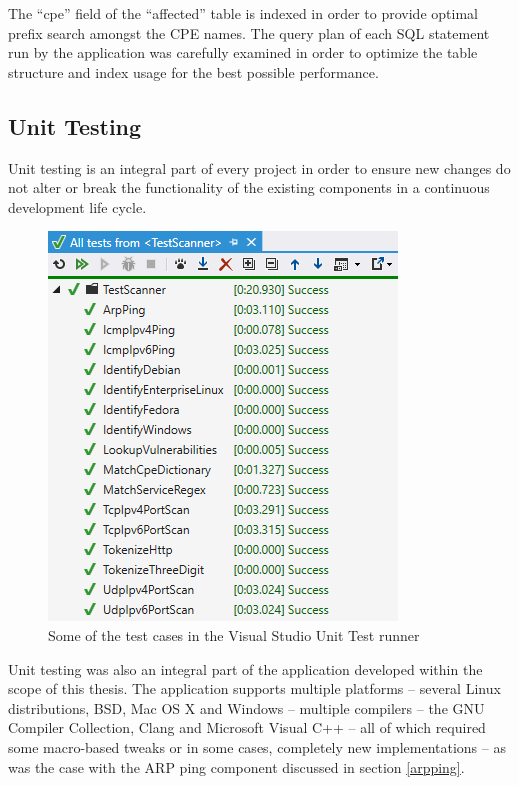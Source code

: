 \documentclass[a4paper,12pt]{article}
\begin{document}
	The ``cpe'' field of the ``affected'' table is indexed in order to provide optimal prefix search amongst the CPE names. The query plan of each SQL statement run by the application was carefully examined in order to optimize the table structure and index usage for the best possible performance.

\subsection{Unit Testing}
 

	Unit testing is an integral part of every project in order to ensure new changes do not alter or break the functionality of the existing components in a continuous development life cycle.
	
	\begin{figure}[!htbp]
		\centering
		\includegraphics[scale=0.75]{unittests.png}
		\caption{Some of the test cases in the Visual Studio Unit Test runner}
		\label{unittestscr}
	\end{figure}
	
\newpage
	
	Unit testing was also an integral part of the application developed within the scope of this thesis. The application supports multiple platforms -- several Linux distributions, BSD, Mac OS X and Windows -- multiple compilers -- the GNU Compiler Collection, Clang and Microsoft Visual C++ -- all of which required some macro-based tweaks or in some cases, completely new implementations -- as was the case with the ARP ping component discussed in section \ref{arpping}.
	
\end{document}
